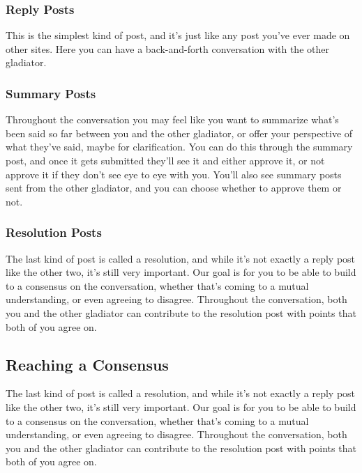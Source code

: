 \documentclass[12pt]{article}
\begin{document}
\subsubsection{Reply Posts}
This is the simplest kind of post, and it's just like any post you've ever made
on other sites. Here you can have a back-and-forth conversation with the other
gladiator.

\subsubsection{Summary Posts}
Throughout the conversation you may feel like you want to summarize what's been
said so far between you and the other gladiator, or offer your perspective of
what they've said, maybe for clarification. You can do this through the summary
post, and once it gets submitted they'll see it and either approve it, or not
approve it if they don't see eye to eye with you.  You'll also see summary posts
sent from the other gladiator, and you can choose whether to approve them or
not.

\subsubsection{Resolution Posts}
The last kind of post is called a resolution, and while it's not exactly a reply
post like the other two, it's still very important. Our goal is for you to be
able to build to a consensus on the conversation, whether that's coming to a
mutual understanding, or even agreeing to disagree.  Throughout the
conversation, both you and the other gladiator can contribute to the resolution
post with points that both of you agree on.

\subsection{Reaching a Consensus}
The last kind of post is called a resolution, and while it's not exactly a reply
post like the other two, it's still very important. Our goal is for you to be
able to build to a consensus on the conversation, whether that's coming to a
mutual understanding, or even agreeing to disagree.  Throughout the
conversation, both you and the other gladiator can contribute to the resolution
post with points that both of you agree on.
\end{document}
